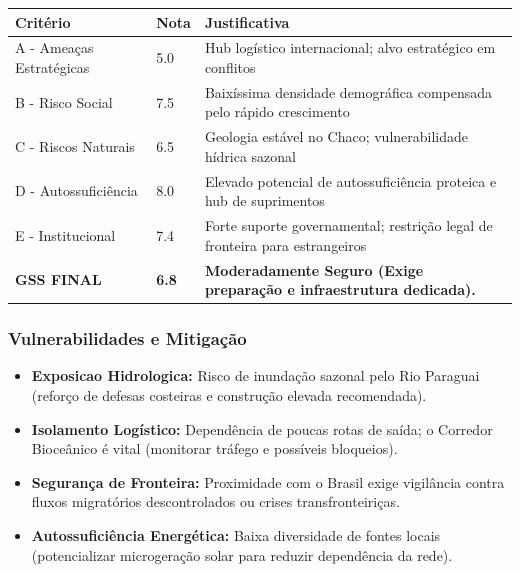 \begin{table}[ht!]
\small \begin{tabular}{p{3.0cm}p{0.8cm}p{6.0cm}} \toprule
\textbf{Critério} & \textbf{Nota} & \textbf{Justificativa} \\ \midrule
A - Ameaças Estratégicas & 5.0 & Hub logístico internacional; alvo estratégico em conflitos \\
B - Risco Social & 7.5 & Baixíssima densidade demográfica compensada pelo rápido crescimento \\
C - Riscos Naturais & 6.5 & Geologia estável no Chaco; vulnerabilidade hídrica sazonal \\
D - Autossuficiência & 8.0 & Elevado potencial de autossuficiência proteica e hub de suprimentos \\
E - Institucional & 7.4 & Forte suporte governamental; restrição legal de fronteira para estrangeiros \\
\midrule \textbf{GSS FINAL} & \textbf{6.8} & \textbf{Moderadamente Seguro (Exige preparação e infraestrutura dedicada).} \\ \bottomrule \end{tabular}
\end{table}
\subsubsection{Vulnerabilidades e
Mitigação}

\begin{itemize}
\tightlist
\item
  \textbf{Exposicao Hidrologica:} Risco de inundação sazonal pelo Rio
  Paraguai (reforço de defesas costeiras e construção elevada
  recomendada).
\item
  \textbf{Isolamento Logístico:} Dependência de poucas rotas de saída; o
  Corredor Bioceânico é vital (monitorar tráfego e possíveis bloqueios).
\item
  \textbf{Segurança de Fronteira:} Proximidade com o Brasil exige
  vigilância contra fluxos migratórios descontrolados ou crises
  transfronteiriças.
\item
  \textbf{Autossuficiência Energética:} Baixa diversidade de fontes
  locais (potencializar microgeração solar para reduzir dependência da
  rede).
\end{itemize}

